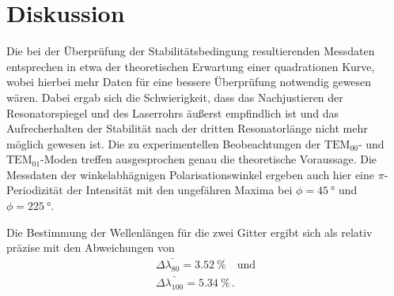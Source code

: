 \section{Diskussion}
\label{sec:Diskussion}

Die bei der Überprüfung der Stabilitätsbedingung resultierenden Messdaten entsprechen in etwa der theoretischen Erwartung
einer quadrationen Kurve, wobei hierbei mehr Daten für eine bessere Überprüfung notwendig gewesen wären.
Dabei ergab sich die Schwierigkeit, 
dass das Nachjustieren der Resonatorspiegel und des Laserrohrs äußerst empfindlich ist
und das Aufrecherhalten der Stabilität nach der dritten Resonatorlänge nicht mehr möglich gewesen ist.
Die zu experimentellen Beobeachtungen der $\text{TEM}_{00}$- und $\text{TEM}_{01}$-Moden treffen ausgesprochen genau die
theoretische Voraussage. 
Die Messdaten der winkelabhägnigen Polarisationswinkel ergeben auch hier eine $\pi$-Periodizität der Intensität
mit den ungefähren Maxima bei $\phi = \qty{45}{\degree}$ und $\phi = \qty{225}{\degree}$.

Die Bestimmung der Wellenlängen für die zwei Gitter ergibt sich als relativ präzise mit den Abweichungen von
\begin{align*}
    \Delta \bar{\lambda_{80}} = \qty{3.52}{\percent} \quad \text{und} \\
    \Delta \bar{\lambda_{100}} = \qty{5.34}{\percent} \, .
\end{align*}